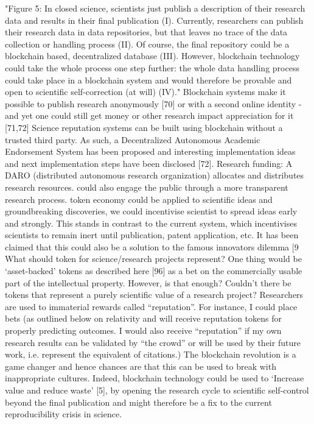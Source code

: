 \documentclass[runningheads]{llncs}
\begin{document}
"Figure 5: In closed science, scientists just publish a description of their research data and results in their final publication (I). Currently, researchers can publish their research data in data repositories, but that leaves no trace of the data collection or handling process (II). Of course, the final repository could be a blockchain based, decentralized database (III). However, blockchain technology could take the whole process one step further: the whole data handling process could take place in a blockchain system and would therefore be provable and open to scientific self-correction (at will) (IV)." 
Blockchain systems make it possible to publish research anonymously [70] or with a second online identity - and yet one could still get money or other research impact appreciation for it [71,72]
Science reputation systems can be built using blockchain without a trusted third party. 
As such, a Decentralized Autonomous Academic Endorsement System has been proposed and interesting implementation ideas and next implementation steps have been disclosed [72].
Research funding: A DARO (distributed autonomous research organization) allocates and distributes research resources.
could also engage the public through a more transparent research process. 
token economy could be applied to scientific ideas and groundbreaking discoveries, we could incentivise scientist to spread ideas early and strongly. This stands in contrast to the current system, which incentivises scientists to remain inert until publication, patent application, etc. It has been claimed that this could also be a solution to the famous innovators dilemma [9
What should token for science/research projects represent? One thing would be ‘asset-backed’ tokens as described here [96] as a bet on the commercially usable part of the intellectual property. However, is that enough? Couldn't there be tokens that represent a purely scientific value of a research project? Researchers are used to immaterial rewards called “reputation”. For instance, I could place bets (as outlined below on relativity and will receive reputation tokens for properly predicting outcomes. I would also receive “reputation” if my own research results can be validated by “the crowd” or will be used by their future work, i.e. represent the equivalent of citations.)  
The blockchain revolution is a game changer and hence chances are that this can be used to break with inappropriate cultures. Indeed, blockchain technology could be used to ‘Increase value and reduce waste’ [5], by opening the research cycle to scientific self-control beyond the final publication and might therefore be a fix to the current reproducibility crisis in science. 
\end{document}
